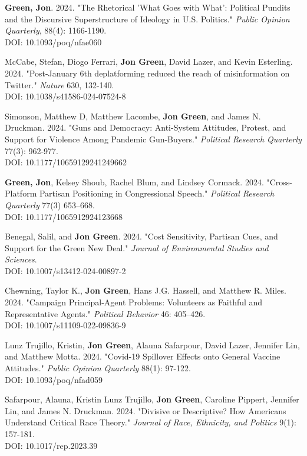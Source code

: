 \documentclass[letterpaper]{article}
\begin{document}
\begin{etaremune}
\item \textbf{Green, Jon}. 2024. "The Rhetorical 'What Goes with What': Political Pundits and the Discursive Superstructure of Ideology in U.S. Politics." \textit{Public Opinion Quarterly}, 88(4): 1166-1190.\\
DOI: 10.1093/poq/nfae060

\item McCabe, Stefan, Diogo Ferrari, \textbf{Jon Green}, David Lazer, and Kevin Esterling. 2024. "Post-January 6th deplatforming reduced the reach of misinformation on Twitter." \textit{Nature} 630, 132-140. \\
DOI: 10.1038/s41586-024-07524-8

\item Simonson, Matthew D, Matthew Lacombe, \textbf{Jon Green}, and James N. Druckman. 2024. "Guns and Democracy: Anti-System Attitudes, Protest, and Support for Violence Among Pandemic Gun-Buyers." \textit{Political Research Quarterly} 77(3): 962-977. \\
DOI: 10.1177/10659129241249662

\item \textbf{Green, Jon}, Kelsey Shoub, Rachel Blum, and Lindsey Cormack. 2024. "Cross-Platform Partisan Positioning in Congressional Speech." \textit{Political Research Quarterly} 77(3) 653–668. \\
DOI: 10.1177/1065912924123668

\item Benegal, Salil, and \textbf{Jon Green}. 2024. "Cost Sensitivity, Partisan Cues, and Support for the Green New Deal." \textit{Journal of Environmental Studies and Sciences}. \\
DOI: 10.1007/s13412-024-00897-2

\item Chewning, Taylor K., \textbf{Jon Green}, Hans J.G. Hassell, and Matthew R. Miles. 2024. "Campaign Principal-Agent Problems: Volunteers as Faithful and Representative Agents." \textit{Political Behavior} 46: 405–426. \\
DOI: 10.1007/s11109-022-09836-9

\item Lunz Trujillo, Kristin, \textbf{Jon Green}, Alauna Safarpour, David Lazer, Jennifer Lin, and Matthew Motta. 2024. "Covid-19 Spillover Effects onto General Vaccine Attitudes." \textit{Public Opinion Quarterly} 88(1): 97-122.\\
DOI: 10.1093/poq/nfad059

\item Safarpour, Alauna, Kristin Lunz Trujillo, \textbf{Jon Green}, Caroline Pippert, Jennifer Lin, and James N. Druckman. 2024. "Divisive or Descriptive? How Americans Understand Critical Race Theory." \textit{Journal of Race, Ethnicity, and Politics} 9(1): 157-181. \\
DOI: 10.1017/rep.2023.39


\end{etaremune}
\end{document}
